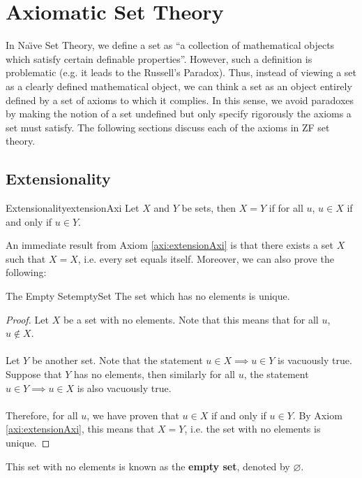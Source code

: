 \documentclass[math]{amznotes}
\theoremstyle{remark}
\begin{document}
\chapter{Axiomatic Set Theory}
In Na\"\i ve Set Theory, we define a set as ``a collection of mathematical objects which satisfy certain definable properties''. However, such a definition is problematic (e.g. it leads to the Russell's Paradox). Thus, instead of viewing a set as a clearly defined mathematical object, we can think a set as an object entirely defined by a set of axioms to which it complies. In this sense, we avoid paradoxes by making the notion of a set undefined but only specify rigorously the axioms a set must satisfy. The following sections discuss each of the axioms in ZF set theory.
\section{Extensionality}
\begin{axibox}{Extensionality}{extensionAxi}
    Let $X$ and $Y$ be sets, then $X = Y$ if for all $u$, $u \in X$ if and only if $u \in Y$.
\end{axibox}
An immediate result from Axiom \ref{axi:extensionAxi} is that there exists a set $X$ such that $X = X$, i.e. every set equals itself. Moreover, we can also prove the following:
\begin{thmbox}{The Empty Set}{emptySet}
    The set which has no elements is unique.
    \tcblower   
    \begin{proof}
        Let $X$ be a set with no elements. Note that this means that for all $u$, $u \notin X$.
        \\\\
        Let $Y$ be another set. Note that the statement $u \in X \implies u \in Y$ is vacuously true. Suppose that $Y$ has no elements, then similarly for all $u$, the statement~$u \in Y \implies u \in X$ is also vacuously true. 
        \\\\
        Therefore, for all $u$, we have proven that $u \in X$ if and only if $u \in Y$. By Axiom \ref{axi:extensionAxi}, this means that $X = Y$, i.e. the set with no elements is unique.
    \end{proof}
\end{thmbox}
This set with no elements is known as the {\color{red} \textbf{empty set}}, denoted by $\varnothing$.
\end{document}
